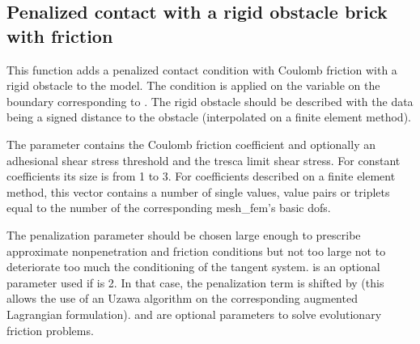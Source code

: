 \documentclass[a4paper,11pt,english]{sphinxmanual}
\begin{document}
\subsection{Penalized contact with a rigid obstacle brick with friction}
\label{\detokenize{userdoc/model_contact_friction:penalized-contact-with-a-rigid-obstacle-brick-with-friction}}
\begin{sphinxVerbatim}[commandchars=\\\{\}]
         
              
       
\end{sphinxVerbatim}

This function adds a penalized contact condition with Coulomb friction with a
rigid obstacle to the model.
The condition is applied on the variable 
on the boundary corresponding to . The rigid obstacle should
be described with the data  being a signed distance to
the obstacle (interpolated on a finite element method).

The parameter  contains the Coulomb friction
coefficient and optionally an adhesional shear stress threshold and the
tresca limit shear stress. For constant coefficients its size is from
1 to 3. For coefficients described on a finite element method, this
vector contains a number of single values, value pairs or triplets
equal to the number of the corresponding mesh\_fem’s basic dofs.

The penalization parameter  should be chosen
large enough to prescribe approximate non\sphinxhyphen{}penetration and friction
conditions but not too large not to deteriorate too much the
conditioning of the tangent system.
 is an optional parameter used if 
is 2. In that case, the penalization term is shifted by  (this
allows the use of an Uzawa algorithm on the corresponding augmented
Lagrangian formulation).
 and  are optional parameters to solve
evolutionary friction problems.
\end{document}
